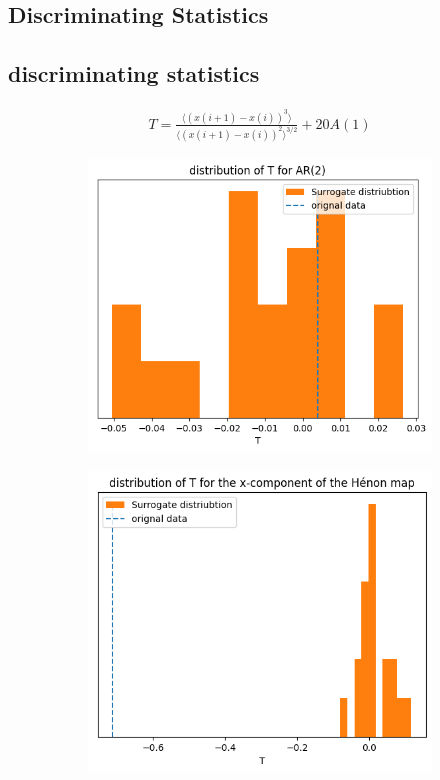 \subsection{Discriminating Statistics}
\begin{frame}
  \frametitle{\insertsectionhead}
  \framesubtitle{\insertsubsectionhead}
\subsection{discriminating statistics}
\begin{gather*}
  T = \frac{\langle(x(i+1)-x(i))^3 \rangle}{\langle (x(i+1)-x(i))^2 \rangle^{3/2} } + 20A(1)
\end{gather*} \cite{THEILER1996221}
\begin{figure}
  \centering
  \begin{subfigure}[b]{0.3\textwidth}
    \includegraphics[width=\textwidth]{figs/non_lin_ar2_T.png}
  \end{subfigure}
  \begin{subfigure}[b]{0.3\textwidth}
    \includegraphics[width=\textwidth]{figs/non_lin_henon_T.png}

\end{subfigure}
\end{figure}
\end{frame}

